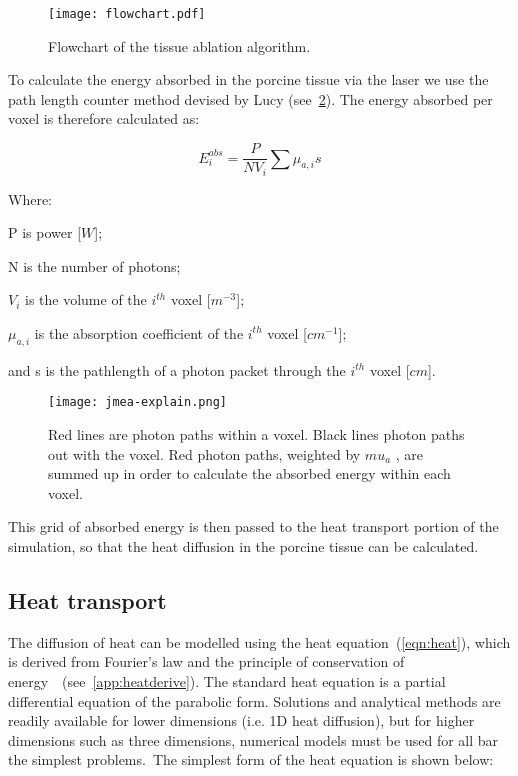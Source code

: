 \begin{figure}
\centering
\texttt{[image: flowchart.pdf]}
\caption{Flowchart of the tissue ablation algorithm.}
\label{fig:algo}
\end{figure}

To calculate the energy absorbed in the porcine tissue via the laser we use the path length counter method devised by Lucy \cite{lucy1999computing} (see~\cref{fig:jmea-explain}). The energy absorbed per voxel is therefore calculated as:

\begin{equation}
E_{i}^{abs} = \frac{P}{N V_i}\sum\mu_{a,i} s
\label{eqn:Eabs}
\end{equation}

\noindent Where:

	\indent P is power [$W$];
	
	\indent N is the number of photons;
	
	\indent $V_i$ is the volume of the $i^{th}$ voxel [$m^{-3}$];
	
	\indent $\mu_{a,i}$ is the absorption coefficient of the $i^{th}$ voxel [$cm^{-1}$];
	
	\indent and s is the pathlength of a photon packet through the $i^{th}$ voxel [$cm$].
	
	\medskip
	
\begin{figure}
\centering
\texttt{[image: jmea-explain.png]}
\caption{Red lines are photon paths within a voxel. Black lines photon paths out with the voxel. Red photon paths, weighted by $mu_a$ , are summed up in order to calculate the absorbed energy within each voxel.}
\label{fig:jmea-explain}
\end{figure}	
		
This grid of absorbed energy is then passed to the heat transport portion of the simulation, so that the heat diffusion in the porcine tissue can be calculated.
\newpage
\subsection{Heat transport}

The diffusion of heat can be modelled using the heat equation~(\cref{eqn:heat}), which is derived from Fourier's law and the principle of conservation of energy~\cite{widder1976heat}~(see~\cref{app:heatderive}). 
The standard heat equation is a partial differential equation of the parabolic form. Solutions and analytical methods are readily available for lower dimensions (i.e. 1D heat diffusion), but for higher dimensions such as three dimensions, numerical models must be used for all bar the simplest problems.~The simplest form of the heat equation is shown below:

